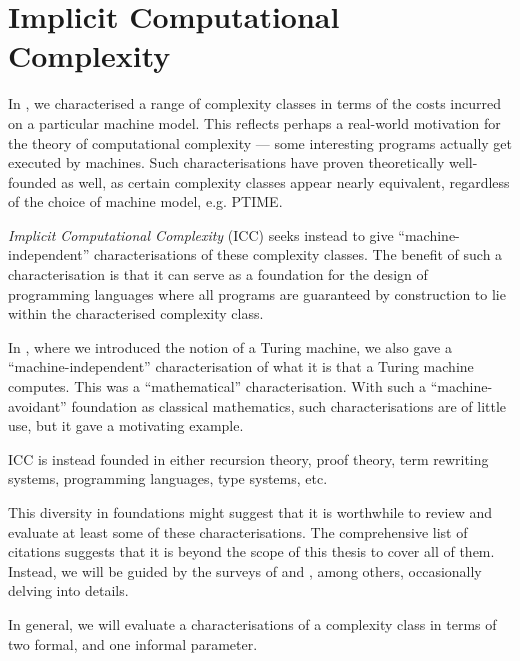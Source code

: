 \chapter{Implicit Computational Complexity} \label{sec:icc}

In , we characterised a range of complexity
classes in terms of the costs incurred on a particular machine model. This
reflects perhaps a real-world motivation for the theory of computational
complexity --- some interesting programs actually get executed by machines.
Such characterisations have proven theoretically well-founded as well, as
certain complexity classes appear nearly equivalent, regardless of the choice
of machine model, e.g. PTIME.

\emph{Implicit Computational Complexity} (ICC) seeks instead to give
``machine-independent'' characterisations of these complexity classes.  The
benefit of such a characterisation is that it can serve as a foundation for the
design of programming languages where all programs are guaranteed by
construction to lie within the characterised complexity class.

In , where we introduced the notion of a Turing machine,
we also gave a ``machine-independent'' characterisation of what it is that a
Turing machine computes. This was a ``mathematical'' characterisation. With
such a ``machine-avoidant'' foundation as classical mathematics, such
characterisations are of little use, but it gave a motivating example.

ICC is instead founded in either recursion theory\cite{cobham-1965,
bellantoni-cook-1992, leivant-1995, marion-2009}, proof
theory\cite{girard-scedorov-scott-1992, girard-1998, asperti-roversi-2002,
lafont-2004, dal-lago-hofmann-2010}, term rewriting
systems\cite{beckmann-weiermann-1996, bonfante-et-al-1999,
avanzini-et-al-2012, de-carvalho-simonsen-2014}, programming
languages\cite{jones-1999}, type systems\cite{?}, etc.

This diversity in foundations might suggest that it is worthwhile to review and
evaluate  at least some of these characterisations. The comprehensive list of
citations suggests that it is beyond the scope of this thesis to cover all of
them. Instead, we will be guided by the surveys of \cite{hofmann-2000} and
\cite{dal-lago-2012}, among others, occasionally delving into details.

In general, we will evaluate a characterisations of a complexity class in terms
of two formal, and one informal parameter.

